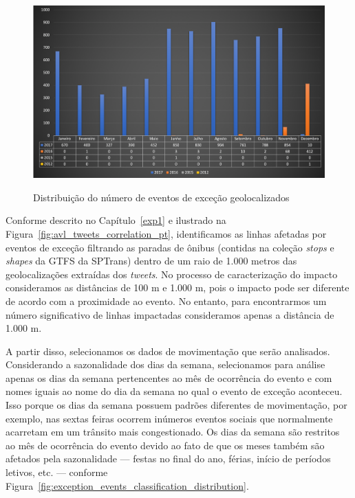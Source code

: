 \documentclass[
	12pt,				%
	oneside,			%
	a4paper,			%
	english,			%
	brazil				%
	]{abntex2ppgsi}
\begin{document}
{{{\begin{figure}[!htb]
	\centering
 	  \caption{Distribuição do número de eventos de exceção geolocalizados}
		\includegraphics[width=1\linewidth]{images/geolocated_exception_events_distribution_pt.png}
	\label{fig:geolocated_exception_events_distribution}
\end{figure}

Conforme descrito no Capítulo~\ref{exp1} e ilustrado na Figura~\ref{fig:avl_tweets_correlation_pt}, identificamos as linhas afetadas por eventos de exceção filtrando as paradas de ônibus (contidas na coleção \textit{stops}  e \textit{shapes} da GTFS da SPTrans) dentro de um raio de 1.000 metros das geolocalizações extraídas dos \textit{tweets}. No processo de caracterização do impacto consideramos as distâncias de 100 m e 1.000 m, pois o impacto pode ser diferente de acordo com a proximidade ao evento. No entanto, para encontrarmos um número significativo de linhas impactadas consideramos apenas a distância de 1.000 m.

A partir disso, selecionamos os dados de movimentação que serão analisados. Considerando a sazonalidade dos dias da semana, selecionamos para análise apenas os dias da semana pertencentes ao mês de ocorrência do evento e com nomes iguais ao nome do dia da semana no qual o evento de exceção aconteceu. Isso porque os dias da semana possuem padrões diferentes de movimentação, por exemplo, nas sextas feiras ocorrem inúmeros eventos sociais que normalmente acarretam em um trânsito mais congestionado. Os dias da semana são restritos ao mês de ocorrência do evento devido ao fato de que os meses também são afetados pela sazonalidade --- festas no final do ano, férias, início de períodos letivos, etc. --- conforme Figura~\ref{fig:exception_events_classification_distribution}.

}}}
\end{document}
